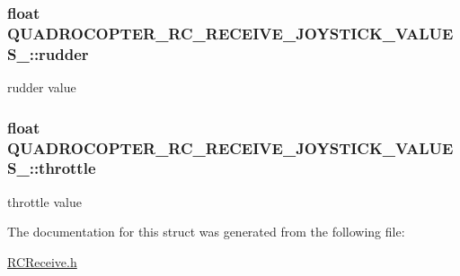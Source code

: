 \subsubsection[{\texorpdfstring{rudder}{rudder}}]{\setlength{\rightskip}{0pt plus 5cm}float Q\+U\+A\+D\+R\+O\+C\+O\+P\+T\+E\+R\+\_\+\+R\+C\+\_\+\+R\+E\+C\+E\+I\+V\+E\+\_\+\+J\+O\+Y\+S\+T\+I\+C\+K\+\_\+\+V\+A\+L\+U\+E\+S\+\_\+\+::rudder}\hypertarget{struct_q_u_a_d_r_o_c_o_p_t_e_r___r_c___r_e_c_e_i_v_e___j_o_y_s_t_i_c_k___v_a_l_u_e_s___a7ca788c293727de925931fd07b27db49}{}\label{struct_q_u_a_d_r_o_c_o_p_t_e_r___r_c___r_e_c_e_i_v_e___j_o_y_s_t_i_c_k___v_a_l_u_e_s___a7ca788c293727de925931fd07b27db49}
rudder value 
\subsubsection[{\texorpdfstring{throttle}{throttle}}]{\setlength{\rightskip}{0pt plus 5cm}float Q\+U\+A\+D\+R\+O\+C\+O\+P\+T\+E\+R\+\_\+\+R\+C\+\_\+\+R\+E\+C\+E\+I\+V\+E\+\_\+\+J\+O\+Y\+S\+T\+I\+C\+K\+\_\+\+V\+A\+L\+U\+E\+S\+\_\+\+::throttle}\hypertarget{struct_q_u_a_d_r_o_c_o_p_t_e_r___r_c___r_e_c_e_i_v_e___j_o_y_s_t_i_c_k___v_a_l_u_e_s___a5d7ec5f69a09aed6b1dc342b82ab07ff}{}\label{struct_q_u_a_d_r_o_c_o_p_t_e_r___r_c___r_e_c_e_i_v_e___j_o_y_s_t_i_c_k___v_a_l_u_e_s___a5d7ec5f69a09aed6b1dc342b82ab07ff}
throttle value 

The documentation for this struct was generated from the following file\+:\begin{DoxyCompactItemize}
\item 
\hyperlink{_r_c_receive_8h}{R\+C\+Receive.\+h}\end{DoxyCompactItemize}
